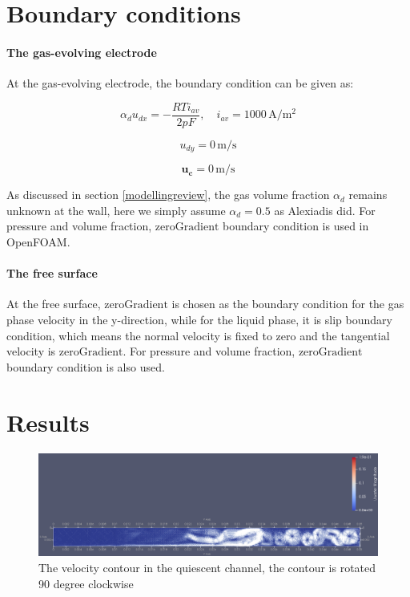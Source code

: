 \section*{Boundary conditions}


\paragraph{The gas-evolving electrode}
\*

At the gas-evolving electrode, the boundary condition can be given as:

\begin{equation}
    \alpha_d u_{dx} = - \frac{RTi_{av}}{2pF}, \quad i_{av} = 1000 \, \mathrm{A/m^2}
\end{equation}

\begin{equation}
    u_{dy} = 0 \, \mathrm{m/s}
\end{equation}

\begin{equation}
    \mathbf{u_{c}} = 0 \, \mathrm{m/s}
\end{equation}

As discussed in section \ref{modellingreview}, the gas volume fraction $\alpha_d$ remains unknown at the wall, here we simply assume $\alpha_d = 0.5$ as Alexiadis did. For pressure and volume fraction, $ \mathrm{zeroGradient}$ boundary condition is used in OpenFOAM.

\paragraph{The free surface}
\*

At the free surface, $ \mathrm{zeroGradient}$ is chosen as the boundary condition for the gas phase velocity in the y-direction, while for the liquid phase, it is slip boundary condition, which means the normal velocity is fixed to zero and the tangential velocity is $ \mathrm{zeroGradient}$. For pressure and volume fraction, $ \mathrm{zeroGradient}$ boundary condition is also used.

\section*{Results}

\begin{figure}[H]
    \centering
    \includegraphics[width=\textwidth]{velocitycontourpseudoturbulence.png}
    \caption{The velocity contour in the quiescent channel, the contour is rotated 90 degree clockwise}
    \label{contourpt}
\end{figure}

